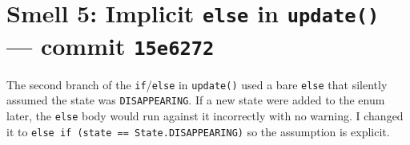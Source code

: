\documentclass[10pt]{article}
\begin{document}
\section{Smell 5: Implicit \texttt{else} in \texttt{update()} \normalfont\small — commit \texttt{15e6272}}

The second branch of the \texttt{if}/\texttt{else} in \texttt{update()} used a
bare \texttt{else} that silently assumed the state was \texttt{DISAPPEARING}.
If a new state were added to the enum later, the \texttt{else} body would run
against it incorrectly with no warning. I changed it to
\texttt{else if (state == State.DISAPPEARING)} so the assumption is explicit.
\end{document}
